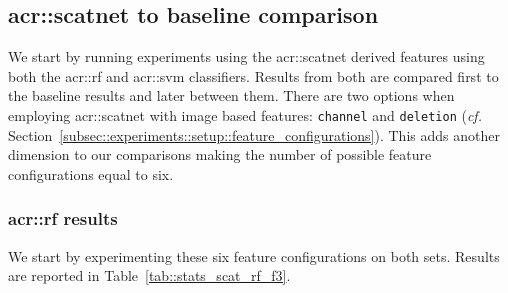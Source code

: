     \subsection{\texorpdfstring{\acrshort*{acr::scatnet}}{ScatNet} to baseline comparison}
        \label{subsec::more_experiments::richer_features::scatnet_baseline}
        We start by running experiments using the \gls{acr::scatnet} derived features using both the \gls{acr::rf} and \gls{acr::svm} classifiers.
        Results from both are compared first to the baseline results and later between them.
        There are two options when employing \gls{acr::scatnet} with image based features: \texttt{channel} and \texttt{deletion} (\textit{cf.} Section~\ref{subsec::experiments::setup::feature_configurations}).
        This adds another dimension to our comparisons making the number of possible feature configurations equal to six.

        \subsubsection{\texorpdfstring{\acrshort*{acr::rf}}{RF} results}
            \label{subsubsec::more_experiments::richer_features::scatnet_baseline::rf}
            We start by experimenting these six feature configurations on both sets.
            Results are reported in Table~\ref{tab::stats_scat_rf_f3}.
            
